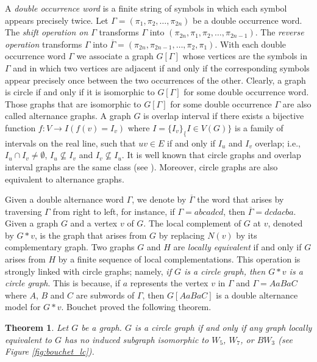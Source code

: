 \documentclass[12pt]{book}
\theoremstyle{plain}
\newtheorem{teo}{Theorem}[chapter]
\theoremstyle{remark}
\begin{document}
A \emph{double occurrence word }is a finite string of symbols in which each symbol appears precisely twice. Let $\Gamma = (\pi_1 , \pi_2 , \ldots , \pi_{2n})$ be a double occurrence word. The \emph{shift operation on $\Gamma$} transforms $\Gamma$ into $(\pi_{2n},\pi_1,\pi_2,\ldots,\pi_{2n-1})$. The \emph{reverse operation }transforms $\Gamma$ into $\overline{\Gamma} = (\pi_{2n}, \pi_{2n-1}, \ldots , \pi_2, \pi_1)$. With each double occurrence word $\Gamma$ we associate a graph $G\left[\Gamma\right]$ whose vertices are the symbols in $\Gamma$ and in which two vertices are adjacent if and only if the corresponding symbols appear precisely once between the two occurrences of the other. Clearly, a graph is circle if and only if it is isomorphic to $G\left[\Gamma\right]$ for some double occurrence word. Those graphs that are isomorphic to $G\left[\Gamma\right]$ for some double occurrence $\Gamma$ are also called alternance graphs. A graph $G$ is overlap interval if there exists a bijective function $f : V \rightarrow I (f(v) = I_v)$ where $I = \{I_v\}_\{I \in V(G)\}$ is a family of intervals on the real line, such that $uv \in E$ if and only if $I_u$ and $I_v$ overlap; i.e., $I_u \cap I_v \neq \emptyset$, $I_u \nsubseteq I_v$ and $I_v \nsubseteq I_u$. It is well known that circle graphs and overlap interval graphs are the same class (see \cite{G04}).
Moreover, circle graphs are also equivalent to alternance graphs. 

Given a double alternance word $\Gamma$, we denote by $\overline{\Gamma}$ the word that arises by traversing $\Gamma$ from right to left, for instance, if $\Gamma = abcadcd$, then $\overline{\Gamma} = dcdacba$.
Given a graph $G$ and a vertex $v$ of $G$. The local complement of $G$ at $v$, denoted by $G*v$, is the graph that arises from $G$ by replacing $N(v)$ by its complementary graph. Two graphs $G$ and $H$ are \emph{locally equivalent} if and only if $G$ arises from $H$ by a finite sequence of local complementations.
This operation is strongly linked with circle graphs; namely, \emph{if $G$ is a circle graph, then $G*v$ is a circle graph}. This is because, if $a$ represents the vertex $v$ in $\Gamma$ and $\Gamma = AaBaC$ where $A$, $B$ and $C$ are subwords of $\Gamma$, then $G\left[AaBaC \right]$ is a double alternance model for $G*v$. Bouchet proved the following theorem.

\begin{teo} \cite{B94} \label{teo:bouchet}
 Let $G$ be a graph. $G$ is a circle graph if and only if any graph locally equivalent to $G$ has no induced subgraph isomorphic to $W_5$, $W_7$, or $BW_3$ (see Figure \ref{fig:bouchet_lc}).
\end{teo} 
\end{document}

